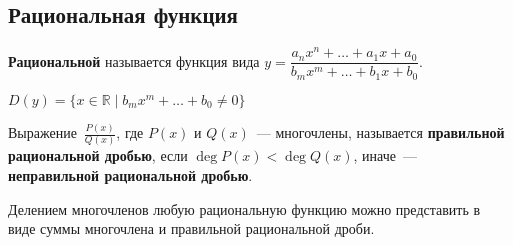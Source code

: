 \subsection{Рациональная функция}
 \textbf{Рациональной} называется функция вида $y = \dfrac{a_n x^n + \ldots + a_1 x + a_0}{b_m x^m + \ldots + b_1 x + b_0}$.

$D(y) = \{ x \in \mathbb R \mid b_m x^m + \ldots + b_0 \neq 0 \}$

Выражение~$\frac{P(x)}{Q(x)}$, где $P(x)$ и $Q(x)$~--- многочлены, называется \textbf{правильной рациональной дробью}, если $\deg P(x) < \deg Q(x)$, иначе~--- \textbf{неправильной рациональной дробью}.

Делением многочленов любую рациональную функцию можно представить в виде суммы многочлена и правильной рациональной дроби.